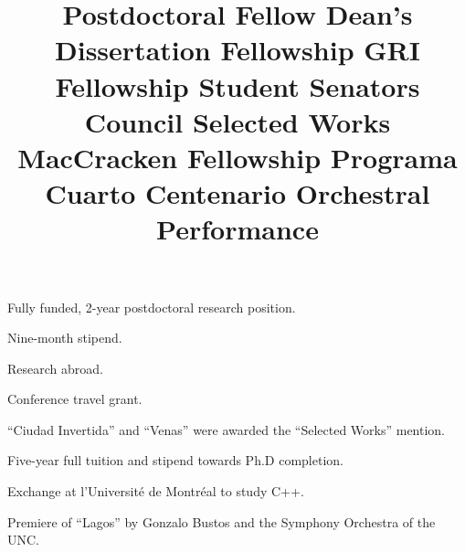  \title{ Postdoctoral Fellow}
 \begin{position}
Fully funded, 2-year postdoctoral research position.
\end{position}

 \title{ Dean's Dissertation Fellowship}
 \begin{position}
Nine-month stipend.
\end{position}

 \title{ GRI Fellowship}
 \begin{position}
Research abroad.
\end{position}

 \title{ Student Senators Council}
 \begin{position}
Conference travel grant.
\end{position}

 \title{ Selected Works}
 \begin{position}
``Ciudad Invertida'' and ``Venas'' were awarded the ``Selected Works'' mention.
\end{position}

 \title{ MacCracken Fellowship}
 \begin{position}
Five-year full tuition and stipend towards Ph.D completion.
\end{position}

 \title{ Programa Cuarto Centenario}
 \begin{position}
Exchange at l'Université de Montréal to study C++.
\end{position}

 \title{ Orchestral Performance}
 \begin{position}
Premiere of ``Lagos'' by Gonzalo Bustos and the Symphony Orchestra of the UNC.
\end{position}